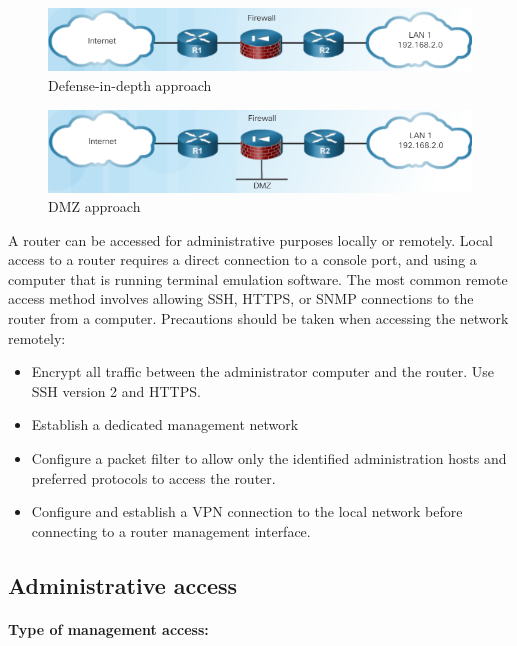 \begin{figure}[hbtp]
\caption{Defense-in-depth approach}\label{DefInDepth}
\centering
\includegraphics[scale=0.6]{pictures/DefInDepth.PNG}
\end{figure}

\begin{figure}[hbtp]
\caption{DMZ approach}\label{DMZ}
\centering
\includegraphics[scale=0.5]{pictures/DMZ.PNG}
\end{figure}

A router can be accessed for administrative purposes locally or remotely. Local access to a router requires a direct connection to a console port, and using a computer that is running terminal emulation software. The most common remote access method involves allowing SSH, HTTPS, or SNMP connections to the router from a computer. Precautions should be taken when accessing the network remotely:

\begin{itemize}
\item Encrypt all traffic between the administrator computer and the router. Use SSH version 2 and HTTPS.
\item Establish a dedicated management network
\item Configure a packet filter to allow only the identified administration hosts and preferred protocols to access the router.
\item Configure and establish a VPN connection to the local network before connecting to a router management interface.
\end{itemize}

\subsection{Administrative access}

\paragraph{Type of management access:} 

